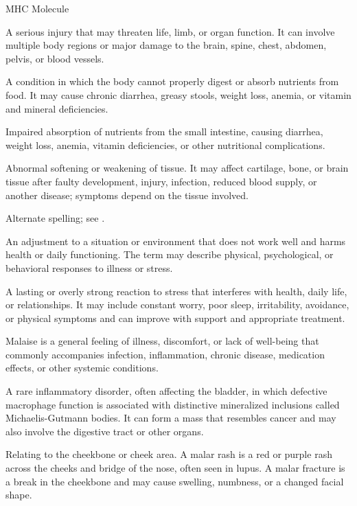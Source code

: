 \synonyms
MHC Molecule

 A serious injury that may threaten life, limb, or organ function. It can involve multiple body regions or major damage to the brain, spine, chest, abdomen, pelvis, or blood vessels.

 A condition in which the body cannot properly digest or absorb nutrients from food. It may cause chronic diarrhea, greasy stools, weight loss, anemia, or vitamin and mineral deficiencies.

 Impaired absorption of nutrients from the small intestine, causing diarrhea, weight loss, anemia, vitamin deficiencies, or other nutritional complications.

 Abnormal softening or weakening of tissue. It may affect cartilage, bone, or brain tissue after faulty development, injury, infection, reduced blood supply, or another disease; symptoms depend on the tissue involved.

 Alternate spelling; see .

 An adjustment to a situation or environment that does not work well and harms health or daily functioning. The term may describe physical, psychological, or behavioral responses to illness or stress.

 A lasting or overly strong reaction to stress that interferes with health, daily life, or relationships. It may include constant worry, poor sleep, irritability, avoidance, or physical symptoms and can improve with support and appropriate treatment.

 Malaise is a general feeling of illness, discomfort, or lack of well-being that commonly accompanies infection, inflammation, chronic disease, medication effects, or other systemic conditions.

 A rare inflammatory disorder, often affecting the bladder, in which defective macrophage function is associated with distinctive mineralized inclusions called Michaelis-Gutmann bodies. It can form a mass that resembles cancer and may also involve the digestive tract or other organs.

 Relating to the cheekbone or cheek area. A malar rash is a red or purple rash across the cheeks and bridge of the nose, often seen in lupus. A malar fracture is a break in the cheekbone and may cause swelling, numbness, or a changed facial shape.

